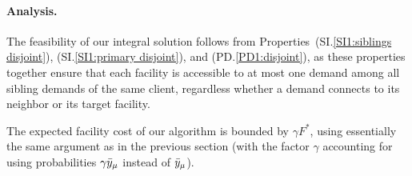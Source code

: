 
\paragraph{Analysis.}
The feasibility of our integral solution follows from
Properties~(SI.\ref{SI1:siblings disjoint}), (SI.\ref{SI1:primary
  disjoint}), and (PD.\ref{PD1:disjoint}), as these properties together
ensure that each facility is accessible to at most one demand among
all sibling demands of the same client, regardless whether a demand
connects to its neighbor or its target facility.

The expected facility cost of our algorithm is bounded by
$\gamma F^\ast$, using essentially the same argument as in
the previous section (with the factor $\gamma$
accounting for using probabilities $\gamma {\bar y}_{\mu}$
instead of ${\bar y}_{\mu}$).

